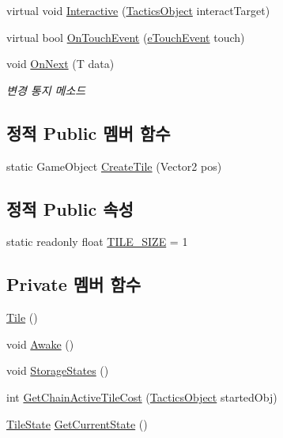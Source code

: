 \begin{DoxyCompactItemize}
\item 
virtual void \hyperlink{class_tactics_object_a5f94ed01497a7072a2785163f4cbc57b}{Interactive} (\hyperlink{class_tactics_object}{Tactics\+Object} interact\+Target)
\item 
virtual bool \hyperlink{class_tactics_object_af34052e62ea471d21e4c601cc79ff717}{On\+Touch\+Event} (\hyperlink{_touch_manager_8cs_ae33e321a424fe84ba8b2fdb81ad40a68}{e\+Touch\+Event} touch)
\item 
void \hyperlink{interface_m_c_n_1_1_i_observer_a2f934b71aa4ddf6f936670d32c3cdff7}{On\+Next} (T data)
\begin{DoxyCompactList}\small\item\em 변경 통지 메소드 \end{DoxyCompactList}\end{DoxyCompactItemize}
\subsection*{정적 Public 멤버 함수}
\begin{DoxyCompactItemize}
\item 
static Game\+Object \hyperlink{class_tile_aec3cdb55a67f4c12d3056355c15bdba2}{Create\+Tile} (Vector2 pos)
\end{DoxyCompactItemize}
\subsection*{정적 Public 속성}
\begin{DoxyCompactItemize}
\item 
static readonly float \hyperlink{class_tile_a51b7dea4344573ba12a461a32517e683}{T\+I\+L\+E\+\_\+\+S\+I\+ZE} = 1
\end{DoxyCompactItemize}
\subsection*{Private 멤버 함수}
\begin{DoxyCompactItemize}
\item 
\hyperlink{class_tile_a7684d2e86beeb06d844ebb7819b11b33}{Tile} ()
\item 
void \hyperlink{class_tile_a4fbf82b2a26cdeb792dc78192d7247dc}{Awake} ()
\item 
void \hyperlink{class_tile_a6cb69a9fad04bee1fa3473aec22428de}{Storage\+States} ()
\item 
int \hyperlink{class_tile_a81b4dd833bdeade289583aabbdcaff73}{Get\+Chain\+Active\+Tile\+Cost} (\hyperlink{class_tactics_object}{Tactics\+Object} started\+Obj)
\item 
\hyperlink{class_tile_1_1_tile_state}{Tile\+State} \hyperlink{class_tile_ae37e08e39263e766fdc612de94fb7a0d}{Get\+Current\+State} ()
\end{DoxyCompactItemize}

